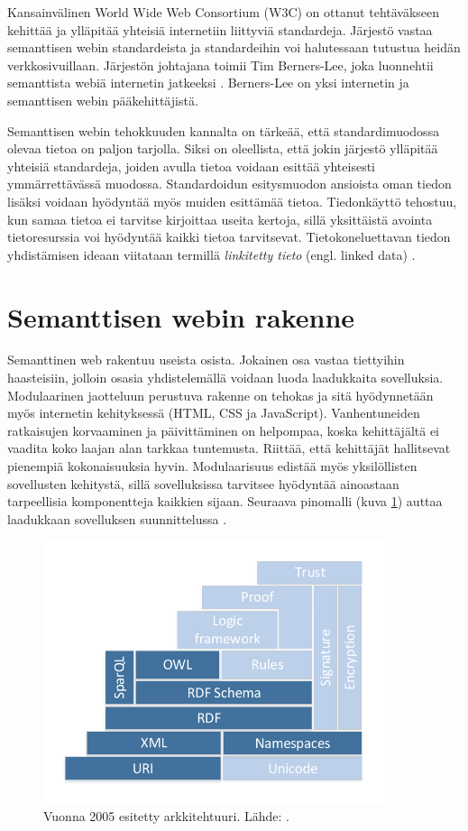 \documentclass[finnish, 12pt, a4paper, elec, utf8, pdfa, online]{aaltothesis}
\begin{document}
Kansainvälinen World Wide Web Consortium (W3C) on ottanut tehtäväkseen kehittää ja ylläpitää yhteisiä internetiin liittyviä standardeja. Järjestö vastaa semanttisen webin standardeista ja standardeihin voi halutessaan tutustua heidän verkkosivuillaan. Järjestön johtajana toimii Tim Berners-Lee, joka luonnehtii semanttista webiä internetin jatkeeksi \cite{W3C} \cite{Berners_visio}. Berners-Lee on yksi internetin ja semanttisen webin pääkehittäjistä.

Semanttisen webin tehokkuuden kannalta on tärkeää, että standardimuodossa olevaa tietoa on paljon tarjolla. Siksi on oleellista, että jokin järjestö ylläpitää yhteisiä standardeja, joiden avulla tietoa voidaan esittää yhteisesti ymmärrettävässä muodossa. Standardoidun esitysmuodon ansioista oman tiedon lisäksi voidaan hyödyntää myös muiden esittämää tietoa. Tiedonkäyttö tehostuu, kun samaa tietoa ei tarvitse kirjoittaa useita kertoja, sillä yksittäistä avointa tietoresurssia voi hyödyntää kaikki tietoa tarvitsevat. Tietokoneluettavan tiedon yhdistämisen ideaan viitataan termillä \textit{linkitetty tieto} (engl. linked data) \cite{linked_w3c} \cite{linked_data_finlad}.
\clearpage

\section{Semanttisen webin rakenne}
Semanttinen web rakentuu useista osista. Jokainen osa vastaa tiettyihin haasteisiin, jolloin osasia yhdistelemällä voidaan luoda laadukkaita sovelluksia. Modulaarinen jaotteluun perustuva rakenne on tehokas ja sitä hyödynnetään myös internetin kehityksessä (HTML, CSS ja JavaScript). Vanhentuneiden ratkaisujen korvaaminen ja päivittäminen on helpompaa, koska kehittäjältä ei vaadita koko laajan alan tarkkaa tuntemusta. Riittää, että kehittäjät hallitsevat pienempiä kokonaisuuksia hyvin. Modulaarisuus edistää myös yksilöllisten sovellusten kehitystä, sillä sovelluksissa tarvitsee hyödyntää ainoastaan tarpeellisia komponentteja kaikkien sijaan. Seuraava pinomalli (kuva \ref{images/sweb-stack2.pdf}) auttaa laadukkaan sovelluksen suunnittelussa \cite{stack}.

\begin{figure}[htb]
\centering
\includegraphics[width=10cm]{images/sweb-stack2.pdf}
\caption{Vuonna 2005 esitetty arkkitehtuuri. Lähde: \cite{stack}. \label{images/sweb-stack2.pdf}}
\end{figure}
\end{document}
